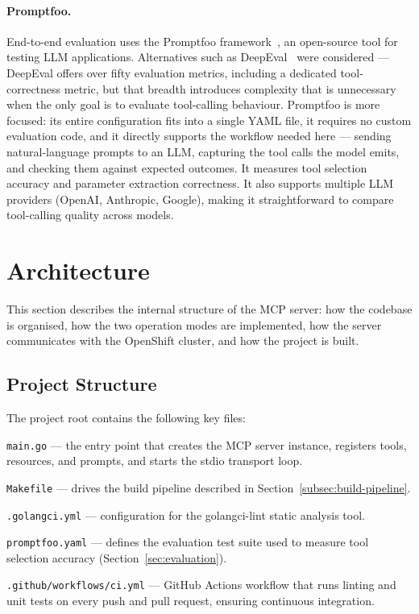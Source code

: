 \documentclass[
  digital,     %
  oneside,     %
  nosansbold,  %
  nocolorbold, %
  lof,         %
  lot,         %
]{fithesis4}
\begin{document}
\paragraph{Promptfoo.}
End-to-end evaluation uses the Promptfoo
framework~\parencite{promptfoo}, an open-source tool for testing LLM
applications. Alternatives such as DeepEval~\parencite{deepeval} were
considered --- DeepEval offers over fifty evaluation metrics, including a
dedicated tool-correctness metric, but that breadth introduces complexity
that is unnecessary when the only goal is to evaluate tool-calling
behaviour.
Promptfoo is more focused: its entire configuration fits into a single
YAML file, it requires no custom evaluation code, and it directly supports
the workflow needed here --- sending natural-language prompts to an LLM,
capturing the tool calls the model emits, and checking them against
expected outcomes. It measures tool selection accuracy and parameter
extraction correctness. It also supports multiple LLM providers (OpenAI,
Anthropic, Google), making it straightforward to compare tool-calling
quality across models.


\section{Architecture}
\label{sec:architecture}

This section describes the internal structure of the MCP server: how the
codebase is organised, how the two operation modes are implemented, how the
server communicates with the OpenShift cluster, and how the project is
built.

\subsection{Project Structure}
\label{subsec:project-structure}

The project root contains the following key files:

\begin{compactitem}
  \item \texttt{main.go} --- the entry point that creates the MCP server
        instance, registers tools, resources, and prompts, and starts the
        stdio transport loop.
  \item \texttt{Makefile} --- drives the build pipeline described in
        Section~\ref{subsec:build-pipeline}.
  \item \texttt{.golangci.yml} --- configuration for the golangci-lint
        static analysis tool.
  \item \texttt{promptfoo.yaml} --- defines the evaluation test suite used
        to measure tool selection accuracy
        (Section~\ref{sec:evaluation}).
  \item \texttt{.github/workflows/ci.yml} --- GitHub Actions workflow that
        runs linting and unit tests on every push and pull request,
        ensuring continuous integration.
\end{compactitem}
\end{document}
